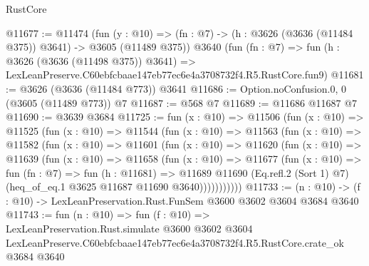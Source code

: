 \begin{lexlean}{RustCore}
\begin{coremodule}
@11677 := @11474
    (fun (y : @10) => (fn : @7) -> (h : @3626 (@3636 (@11484 @375)) @3641) -> @3605 (@11489 @375))
    @3640
    (fun (fn : @7) =>
    fun (h : @3626 (@3636 (@11498 @375)) @3641) =>
    LexLeanPreserve.C60ebfcbaae147eb77ec6e4a3708732f4.R5.RustCore.fun9)
@11681 := @3626 (@3636 (@11484 @773)) @3641
@11686 := Option.noConfusion.{0, 0} (@3605 (@11489 @773)) @7
@11687 := @568 @7
@11689 := @11686 @11687 @7
@11690 := @3639 @3684
@11725 := fun (x : @10) =>
  @11506
    (fun (x : @10) =>
    @11525
      (fun (x : @10) =>
      @11544
        (fun (x : @10) =>
        @11563
          (fun (x : @10) =>
          @11582
            (fun (x : @10) =>
            @11601
              (fun (x : @10) =>
              @11620
                (fun (x : @10) =>
                @11639
                  (fun (x : @10) =>
                  @11658
                    (fun (x : @10) =>
                    @11677
                      (fun (x : @10) =>
                      fun (fn : @7) =>
                      fun (h : @11681) =>
                      @11689
                        @11690
                        (Eq.refl.{2} (Sort 1) @7)
                        (heq_of_eq.{1} @3625 @11687 @11690 @3640)))))))))))
@11733 := (n : @10) -> (f : @10) -> LexLeanPreservation.Rust.FunSem @3600 @3602 @3604 @3684 @3640
@11743 := fun (n : @10) =>
  fun (f : @10) =>
  LexLeanPreservation.Rust.simulate
    @3600
    @3602
    @3604
    LexLeanPreserve.C60ebfcbaae147eb77ec6e4a3708732f4.R5.RustCore.crate_ok
    @3684
    @3640
\end{coremodule}
\end{lexlean}
